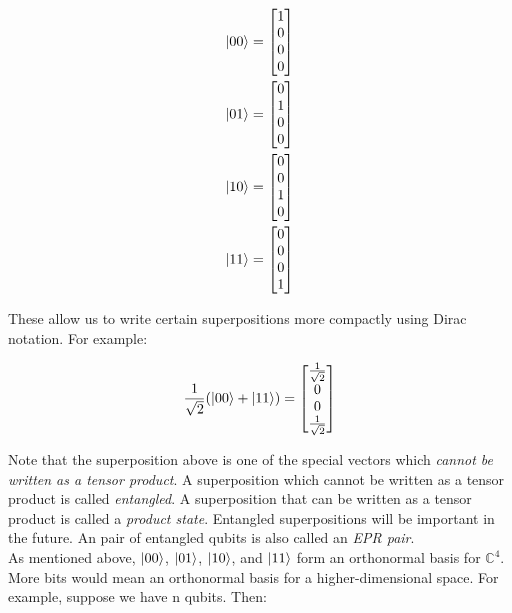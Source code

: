 \documentclass[11pt]{article}
\begin{document}
\begin {align}
\ket{00} &= \begin{bmatrix}
	1 \\ 
	0 \\
	0 \\
	0
\end{bmatrix} \\ 
\ket{01} &= \begin{bmatrix}
	0 \\ 
	1 \\
	0 \\
	0
\end{bmatrix} \\
\ket{10} &= \begin{bmatrix}
	0 \\ 
	0 \\
	1 \\
	0
\end{bmatrix} \\
\ket{11} &= \begin{bmatrix}
	0 \\ 
	0 \\
	0 \\
	1
\end{bmatrix} 
\end{align}

These allow us to write certain superpositions more compactly using Dirac notation. For example: 

\begin {align}
\frac{1}{\sqrt{2}} (\ket{00} + \ket{11}) =   \begin{bmatrix}
	\frac{1}{\sqrt{2}} \\ 
	0 \\
	0 \\
	\frac{1}{\sqrt{2}}
\end{bmatrix} 
\end{align}

Note that the superposition above is one of the special vectors which \textit{cannot be written as a tensor product}. A superposition which cannot be written as a tensor product is called \textit{entangled}. A superposition that can be written as a tensor product is called a \textit{product state}. Entangled superpositions will be important in the future. An pair of entangled qubits is also called an \textit{EPR pair}. \\

As mentioned above, $\ket{00}$, $\ket{01}$, $\ket{10}$, and $\ket{11}$ form an orthonormal basis for $\mathbb{C}^4$.  More bits would mean an orthonormal basis for a higher-dimensional space. For example, suppose we have n qubits. Then: \\
\end{document}
